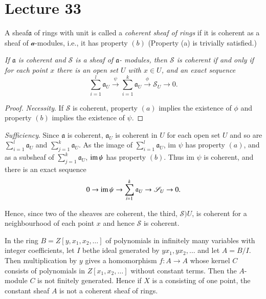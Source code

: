 \chapter{Lecture 33}

\begin{defi*}
A sheaf\pageoriginale $\mathfrak{a}$ of rings with unit is called a
{\em coherent 
  sheaf of rings} if it is coherent as a sheaf of
$\mathscr{a}$-modules, i.e., it has property $(b)$ (Property (a) is
trivially satisfied.)  
\end{defi*}

\textit{If $\mathfrak{a}$ is coherent and $\mathscr{S}$ is a sheaf of
  $\mathfrak{a}$- modules, then $\mathscr{S}$ is coherent if and
  only if for each point $x$ there is an open set $U$ with $x \in U$,
  and an exact sequence} 
$$
\sum^{l}_{i=1} \mathfrak{a}_U \xrightarrow{\psi} \sum^{k}_{i=1} 
\mathfrak{a}_U \xrightarrow{\phi} \mathscr{S}_U \rightarrow 0.  
$$

\begin{proof}
{\em Necessity}. If $\mathscr{S}$ is coherent, property $(a)$ implies 
the existence of $\phi$ and property $(b)$ implies the existence of
$\psi$. 
\end{proof}

\textit{Sufficiency}. Since $\mathfrak{a}$ is coherent,
$\mathfrak{a}_U$ is coherent in $U$ for each open set $U$ and so are
$\sum^{l}_{i=1} \mathfrak{a}_U$ and 
$\sum^{k}_{j=1} \mathfrak{a}_U$. As the image of $\sum^{l}_{i=1}
\mathfrak{a}_U$, 
im $\psi$ has property $(a)$, and as a subsheaf of $\sum^{k}_{j=1}
\mathfrak{a}_U$, $\operatorname{im} \psi$ has property $(b)$. Thus im $\psi$ is
coherent, and there is an exact sequence 
$$
0 \rightarrow \operatorname{im} \psi \rightarrow \sum^{k}_{i=1} \mathfrak{a}_U \rightarrow
\mathscr{S}_U \rightarrow 0. 
$$

Hence, since two of the sheaves are coherent, the third,
$\mathscr{S})U$, is coherent for a neighbourhood of each point $x$ and
hence $\mathscr{S}$ is coherent. 

\begin{exam}%
In the ring $B = Z [y, x_1 , x_2 , \ldots]$ of polynomials in
infinitely many variables with integer coefficients, let $I$
be\pageoriginale the 
ideal generated by $y x_1 , y x_2, \ldots$ and let $A = B/I$. Then
multiplication by $y$ gives a homomorphism $f : A \rightarrow A$ whose
kernel $C$ consists of polynomials in $Z [x_1 , x_2, \ldots]$ without
constant terms. Then the $A$- module $C$ is not finitely generated. Hence
if $X$ is a consisting of one point, the constant sheaf $A$ is not a
coherent sheaf of rings. 
\end{exam}

